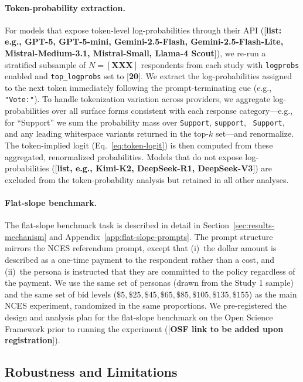 \documentclass[12pt]{article}
\begin{document}
\paragraph{Token-probability extraction.} For models that expose token-level log-probabilities through their API ([\textbf{list: e.g., GPT-5, GPT-5-mini, Gemini-2.5-Flash, Gemini-2.5-Flash-Lite, Mistral-Medium-3.1, Mistral-Small, Llama-4 Scout}]), we re-run a stratified subsample of $N = [\textbf{XXX}]$ respondents from each study with \texttt{logprobs} enabled and \texttt{top\_logprobs} set to [\textbf{20}]. We extract the log-probabilities assigned to the next token immediately following the prompt-terminating cue (e.g., \texttt{"Vote:"}). To handle tokenization variation across providers, we aggregate log-probabilities over all surface forms consistent with each response category---e.g., for ``Support'' we sum the probability mass over \texttt{Support}, \texttt{support}, \texttt{ Support}, and any leading whitespace variants returned in the top-$k$ set---and renormalize. The token-implied logit (Eq.~\ref{eq:token-logit}) is then computed from these aggregated, renormalized probabilities. Models that do not expose log-probabilities ([\textbf{list, e.g., Kimi-K2, DeepSeek-R1, DeepSeek-V3}]) are excluded from the token-probability analysis but retained in all other analyses.

\paragraph{Flat-slope benchmark.} The flat-slope benchmark task is described in detail in Section~\ref{sec:results-mechanism} and Appendix~\ref{app:flat-slope-prompts}. The prompt structure mirrors the NCES referendum prompt, except that (i)~the dollar amount is described as a one-time payment to the respondent rather than a cost, and (ii)~the persona is instructed that they are committed to the policy regardless of the payment. We use the same set of personas (drawn from the Study 1 sample) and the same set of bid levels ($\$5, \$25, \$45, \$65, \$85, \$105, \$135, \$155$) as the main NCES experiment, randomized in the same proportions. We pre-registered the design and analysis plan for the flat-slope benchmark on the Open Science Framework prior to running the experiment ([\textbf{OSF link to be added upon registration}]).

\subsection{Robustness and Limitations}\label{sec:methods-robustness}
\end{document}
